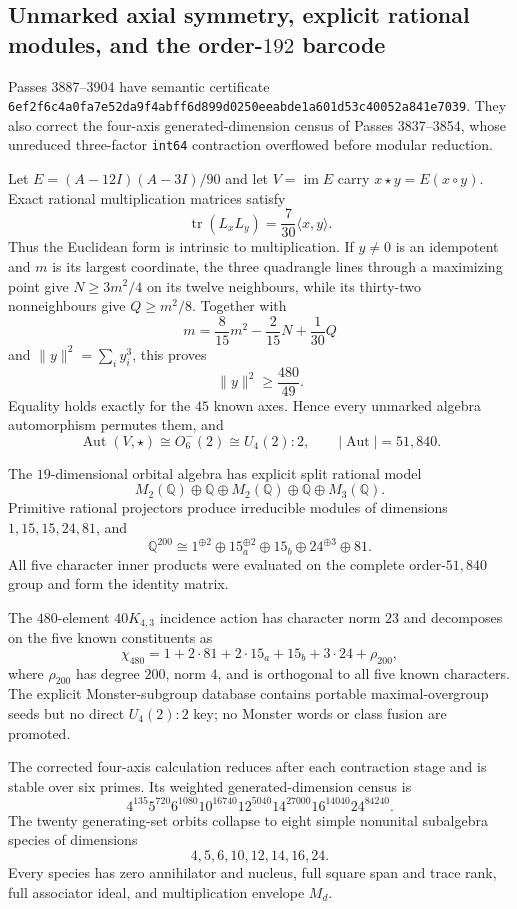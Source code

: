 \subsection{Unmarked axial symmetry, explicit rational modules, and the order-$192$ barcode}
\label{sec:bt3887-3904}

Passes 3887--3904 have semantic certificate
\texttt{6ef2f6c4a0fa7e52da9f4abff6d899d0250eeabde1a601d53c40052a841e7039}.
They also correct the four-axis generated-dimension census of Passes 3837--3854, whose unreduced three-factor \texttt{int64} contraction overflowed before modular reduction.

Let $E=(A-12I)(A-3I)/90$ and let $V=\operatorname{im}E$ carry $x\star y=E(x\circ y)$. Exact rational multiplication matrices satisfy
\[
\operatorname{tr}(L_xL_y)=\frac7{30}\langle x,y\rangle.
\]
Thus the Euclidean form is intrinsic to multiplication. If $y\ne0$ is an idempotent and $m$ is its largest coordinate, the three quadrangle lines through a maximizing point give $N\ge3m^2/4$ on its twelve neighbours, while its thirty-two nonneighbours give $Q\ge m^2/8$. Together with
\[
m=\frac8{15}m^2-\frac2{15}N+\frac1{30}Q
\]
and $\|y\|^2=\sum_i y_i^3$, this proves
\[
\|y\|^2\ge\frac{480}{49}.
\]
Equality holds exactly for the $45$ known axes. Hence every unmarked algebra automorphism permutes them, and
\[
\boxed{\operatorname{Aut}(V,\star)\cong O^-_6(2)\cong U_4(2):2,\qquad |\operatorname{Aut}|=51{,}840.}
\]

The $19$-dimensional orbital algebra has explicit split rational model
\[
M_2(\mathbb Q)\oplus\mathbb Q\oplus M_2(\mathbb Q)\oplus\mathbb Q\oplus M_3(\mathbb Q).
\]
Primitive rational projectors produce irreducible modules of dimensions $1,15,15,24,81$, and
\[
\mathbb Q^{200}\cong1^{\oplus2}\oplus15_a^{\oplus2}\oplus15_b\oplus24^{\oplus3}\oplus81.
\]
All five character inner products were evaluated on the complete order-$51{,}840$ group and form the identity matrix.

The $480$-element $40K_{4,3}$ incidence action has character norm $23$ and decomposes on the five known constituents as
\[
\chi_{480}=1+2\cdot81+2\cdot15_a+15_b+3\cdot24+\rho_{200},
\]
where $\rho_{200}$ has degree $200$, norm $4$, and is orthogonal to all five known characters. The explicit Monster-subgroup database contains portable maximal-overgroup seeds but no direct $U_4(2):2$ key; no Monster words or class fusion are promoted.

The corrected four-axis calculation reduces after each contraction stage and is stable over six primes. Its weighted generated-dimension census is
\[
4^{135}5^{720}6^{1080}10^{16740}12^{5040}14^{27000}16^{14040}24^{84240}.
\]
The twenty generating-set orbits collapse to eight simple nonunital subalgebra species of dimensions
\[
\boxed{4,5,6,10,12,14,16,24.}
\]
Every species has zero annihilator and nucleus, full square span and trace rank, full associator ideal, and multiplication envelope $M_d$.

